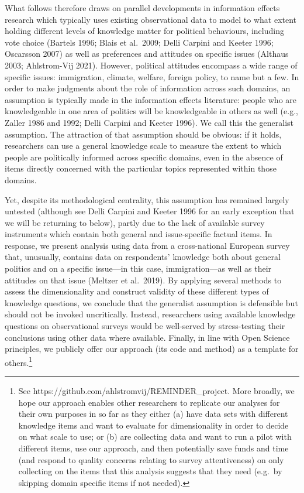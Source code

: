 \documentclass[11pt,halfline,a4paper,]{ouparticle}
\begin{document}
What follows therefore draws on parallel developments in information
effects research which typically uses existing observational data to
model to what extent holding different levels of knowledge matter for
political behaviours, including vote choice (Bartels 1996; Blais et
al.~2009; Delli Carpini and Keeter 1996; Oscarsson 2007) as well as
preferences and attitudes on specific issues (Althaus 2003; Ahlstrom-Vij
2021). However, political attitudes encompass a wide range of specific
issues: immigration, climate, welfare, foreign policy, to name but a
few. In order to make judgments about the role of information across
such domains, an assumption is typically made in the information effects
literature: people who are knowledgeable in one area of politics will be
knowledgeable in others as well (e.g., Zaller 1986 and 1992; Delli
Carpini and Keeter 1996). We call this the generalist assumption. The
attraction of that assumption should be obvious: if it holds,
researchers can use a general knowledge scale to measure the extent to
which people are politically informed across specific domains, even in
the absence of items directly concerned with the particular topics
represented within those domains.

Yet, despite its methodological centrality, this assumption has remained
largely untested (although see Delli Carpini and Keeter 1996 for an
early exception that we will be returning to below), partly due to the
lack of available survey instruments which contain both general and
issue-specific factual items. In response, we present analysis using
data from a cross-national European survey that, unusually, contains
data on respondents' knowledge both about general politics and on a
specific issue---in this case, immigration---as well as their attitudes
on that issue (Meltzer et al.~2019). By applying several methods to
assess the dimensionality and construct validity of these different
types of knowledge questions, we conclude that the generalist assumption
is defensible but should not be invoked uncritically. Instead,
researchers using available knowledge questions on observational surveys
would be well-served by stress-testing their conclusions using other
data where available. Finally, in line with Open Science principles, we
publicly offer our approach (its code and method) as a template for
others.\footnote{See https://github.com/ahlstromvij/REMINDER\_project.
  More broadly, we hope our approach enables other researchers to
  replicate our analyses for their own purposes in so far as they either
  (a) have data sets with different knowledge items and want to evaluate
  for dimensionality in order to decide on what scale to use; or (b) are
  collecting data and want to run a pilot with different items, use our
  approach, and then potentially save funds and time (and respond to
  quality concerns relating to survey attentiveness) on only collecting
  on the items that this analysis suggests that they need (e.g.~by
  skipping domain specific items if not needed).}
\end{document}
